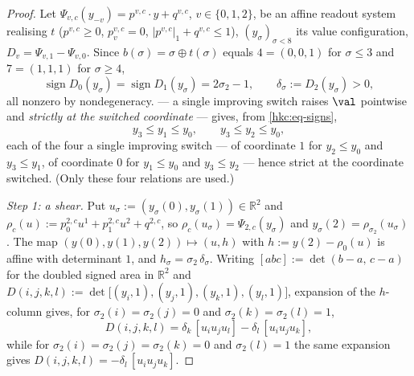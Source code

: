 \begin{proof}
Let $\Psi_{v,c}(y_{-v})=p^{v,c}\cdot y+q^{v,c}$, $v\in\{0,1,2\}$, be an affine
readout system realising $t$ ($p^{v,c}\ge0$, $p^{v,c}_v=0$,
$|p^{v,c}|_1+q^{v,c}\le1$), $(y_\sigma)_{\sigma<8}$ its value configuration,
$D_v=\Psi_{v,1}-\Psi_{v,0}$. Since $b(\sigma)=\sigma\oplus t(\sigma)$ equals
$4=(0,0,1)$ for $\sigma\le3$ and $7=(1,1,1)$ for $\sigma\ge4$,
\begin{equation}\label{hkc:eq-signs}
  \operatorname{sign}D_0(y_\sigma)=\operatorname{sign}D_1(y_\sigma)=2\sigma_2-1,
  \qquad \delta_\sigma:=D_2(y_\sigma)>0 ,
\end{equation}
all nonzero by nondegeneracy.  --- a single improving switch
raises $\val$ pointwise and \emph{strictly at the switched coordinate} ---
gives, from \eqref{hkc:eq-signs},
\begin{equation}\label{hkc:eq-order}
  y_3\le y_1\le y_0,\qquad y_3\le y_2\le y_0,
\end{equation}
each of the four a single improving switch --- of coordinate $1$ for
$y_2\le y_0$ and $y_3\le y_1$, of coordinate $0$ for $y_1\le y_0$ and
$y_3\le y_2$ --- hence strict at the coordinate switched. (Only these four
relations are used.)

\emph{Step 1: a shear.} Put $u_\sigma:=(y_\sigma(0),y_\sigma(1))\in\mathbb R^2$
and $\rho_c(u):=p^{2,c}_0u^1+p^{2,c}_1u^2+q^{2,c}$, so $\rho_c(u_\sigma)=
\Psi_{2,c}(y_\sigma)$ and $y_\sigma(2)=\rho_{\sigma_2}(u_\sigma)$. The map
$(y(0),y(1),y(2))\mapsto(u,h)$ with $h:=y(2)-\rho_0(u)$ is affine with
determinant $1$, and $h_\sigma=\sigma_2\,\delta_\sigma$. Writing
$[abc]:=\det(b-a,\,c-a)$ for the doubled signed area in $\mathbb R^2$ and
$D(i,j,k,l):=\det\bigl[(y_i,1),(y_j,1),(y_k,1),(y_l,1)\bigr]$, expansion of the
$h$-column gives, for $\sigma_2(i)=\sigma_2(j)=0$ and $\sigma_2(k)=\sigma_2(l)=1$,
\begin{equation}\label{hkc:eq-shear}
  D(i,j,k,l)=\delta_k\,[u_iu_ju_l]-\delta_l\,[u_iu_ju_k],
\end{equation}
while for $\sigma_2(i)=\sigma_2(j)=\sigma_2(k)=0$ and $\sigma_2(l)=1$ the same
expansion gives $D(i,j,k,l)=-\delta_l\,[u_iu_ju_k]$.


\end{proof}

